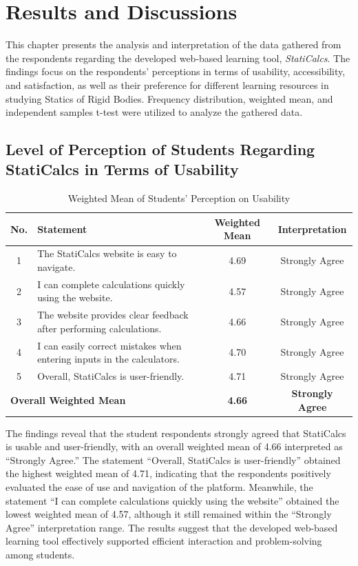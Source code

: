 \chapter{Results and Discussions}\label{ch:4}

This chapter presents the analysis and interpretation of the data gathered from the respondents regarding the developed web-based learning tool, \textit{StatiCalcs}. The findings focus on the respondents’ perceptions in terms of usability, accessibility, and satisfaction, as well as their preference for different learning resources in studying Statics of Rigid Bodies. Frequency distribution, weighted mean, and independent samples t-test were utilized to analyze the gathered data.


\section{Level of Perception of Students Regarding StatiCalcs in Terms of Usability}

\begin{table}[H]
\centering
\caption{Weighted Mean of Students’ Perception on Usability}
\renewcommand{\arraystretch}{1.3}
\begin{tabular}{cp{6.5cm}cc}
\hline
\textbf{No.} & \textbf{Statement} & \textbf{Weighted Mean} & \textbf{Interpretation}\\
\hline
1 & The StatiCalcs website is easy to navigate. & 4.69 & Strongly Agree\\
2 & I can complete calculations quickly using the website. & 4.57 & Strongly Agree\\
3 & The website provides clear feedback after performing calculations. & 4.66 & Strongly Agree\\
4 & I can easily correct mistakes when entering inputs in the calculators. & 4.70 & Strongly Agree\\
5 & Overall, StatiCalcs is user-friendly. & 4.71 & Strongly Agree\\
\multicolumn{2}{l}{\textbf{Overall Weighted Mean}} & \textbf{4.66} & \textbf{Strongly Agree}\\
\hline
\end{tabular}
\end{table}

The findings reveal that the student respondents strongly agreed that StatiCalcs is usable and user-friendly, with an overall weighted mean of 4.66 interpreted as ``Strongly Agree.'' The statement ``Overall, StatiCalcs is user-friendly'' obtained the highest weighted mean of 4.71, indicating that the respondents positively evaluated the ease of use and navigation of the platform. Meanwhile, the statement ``I can complete calculations quickly using the website'' obtained the lowest weighted mean of 4.57, although it still remained within the ``Strongly Agree'' interpretation range. The results suggest that the developed web-based learning tool effectively supported efficient interaction and problem-solving among students.

